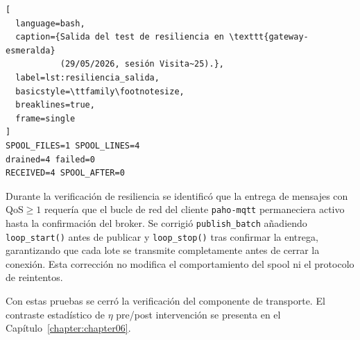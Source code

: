 \begin{lstlisting}[
  language=bash,
  caption={Salida del test de resiliencia en \texttt{gateway-esmeralda}
           (29/05/2026, sesión Visita~25).},
  label=lst:resiliencia_salida,
  basicstyle=\ttfamily\footnotesize,
  breaklines=true,
  frame=single
]
SPOOL_FILES=1 SPOOL_LINES=4
drained=4 failed=0
RECEIVED=4 SPOOL_AFTER=0
\end{lstlisting}

Durante la verificación de resiliencia se identificó que la entrega
de mensajes con \acs{QoS}$\geq 1$ requería que el bucle de red del
cliente \texttt{paho-mqtt} permaneciera activo hasta la confirmación
del broker. Se corrigió \texttt{publish\_batch} añadiendo
\texttt{loop\_start()} antes de publicar y \texttt{loop\_stop()}
tras confirmar la entrega, garantizando que cada lote se transmite
completamente antes de cerrar la conexión. Esta corrección no
modifica el comportamiento del spool ni el protocolo de reintentos.

Con estas pruebas se cerró la verificación del componente de
transporte. El contraste estadístico de $\eta$ pre/post intervención
se presenta en el Capítulo~\ref{chapter:chapter06}.
